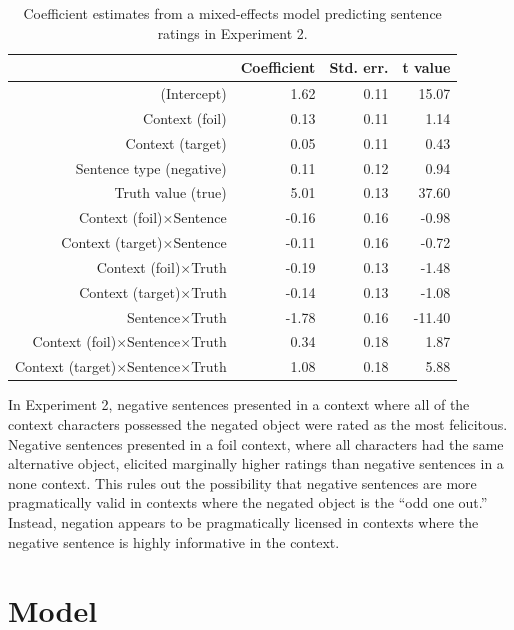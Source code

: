 \documentclass[10pt,letterpaper]{article}
\begin{document}
\begin{table}[t]
\caption{\label{tab:s2} Coefficient estimates from a mixed-effects model predicting sentence ratings in Experiment 2.}
\begin{center}
\small\addtolength{\tabcolsep}{-5pt}
\begin{tabular}{rrrr}
  \hline
 & Coefficient & Std. err. & t value \\ 
  \hline
(Intercept) & 1.62 & 0.11 & 15.07 \\ 
  Context (foil) & 0.13 & 0.11 & 1.14  \\ 
  Context (target) & 0.05 & 0.11 & 0.43  \\ 
  Sentence type (negative) & 0.11 & 0.12 & 0.94 \\
  Truth value (true) & 5.01 & 0.13 & 37.60 \\ 
  Context (foil)$\times$Sentence & -0.16 & 0.16 & -0.98 \\
  Context (target)$\times$Sentence & -0.11 & 0.16 & -0.72 \\
  Context (foil)$\times$Truth & -0.19 & 0.13 & -1.48 \\
  Context (target)$\times$Truth & -0.14 & 0.13 & -1.08 \\
  Sentence$\times$Truth & -1.78 & 0.16 & -11.40 \\
  Context (foil)$\times$Sentence$\times$Truth& 0.34 & 0.18 & 1.87 \\
  Context (target)$\times$Sentence$\times$Truth & 1.08 & 0.18 & 5.88 \\
   \hline
\end{tabular}
\end{center}
\end{table}

In Experiment 2, negative sentences presented in a context where all of the context characters possessed the negated object were rated as the most felicitous.  Negative sentences presented in a foil context, where all characters had the same alternative object, elicited marginally higher ratings than negative sentences in a none context.  This rules out the possibility that negative sentences are more pragmatically valid in contexts where the negated object is the ``odd one out.''  Instead, negation appears to be pragmatically licensed in contexts where the negative sentence is highly informative in the context.  

\section{Model}
\end{document}
